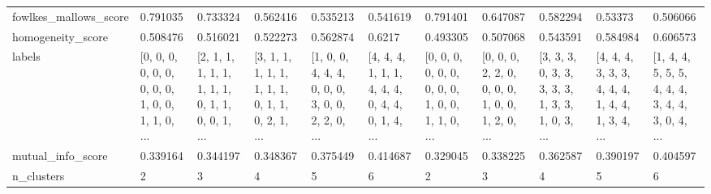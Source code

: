 \begin{tabular}{lllllllllll}
fowlkes\_mallows\_score &                                           0.791035 &                                           0.733324 &                                           0.562416 &                                           0.535213 &                                           0.541619 &                                           0.791401 &                                           0.647087 &                                           0.582294 &                                            0.53373 &                                           0.506066 \\
homogeneity\_score     &                                           0.508476 &                                           0.516021 &                                           0.522273 &                                           0.562874 &                                             0.6217 &                                           0.493305 &                                           0.507068 &                                           0.543591 &                                           0.584984 &                                           0.606573 \\
labels                &  [0, 0, 0, 0, 0, 0, 0, 0, 0, 1, 0, 0, 1, 1, 0, ... &  [2, 1, 1, 1, 1, 1, 1, 1, 1, 0, 1, 1, 0, 0, 1, ... &  [3, 1, 1, 1, 1, 1, 1, 1, 1, 0, 1, 1, 0, 2, 1, ... &  [1, 0, 0, 4, 4, 4, 0, 0, 0, 3, 0, 0, 2, 2, 0, ... &  [4, 4, 4, 1, 1, 1, 4, 4, 4, 0, 4, 4, 0, 1, 4, ... &  [0, 0, 0, 0, 0, 0, 0, 0, 0, 1, 0, 0, 1, 1, 0, ... &  [0, 0, 0, 2, 2, 0, 0, 0, 0, 1, 0, 0, 1, 2, 0, ... &  [3, 3, 3, 0, 3, 3, 3, 3, 3, 1, 3, 3, 1, 0, 3, ... &  [4, 4, 4, 3, 3, 3, 4, 4, 4, 1, 4, 4, 1, 3, 4, ... &  [1, 4, 4, 5, 5, 5, 4, 4, 4, 3, 4, 4, 3, 0, 4, ... \\
mutual\_info\_score     &                                           0.339164 &                                           0.344197 &                                           0.348367 &                                           0.375449 &                                           0.414687 &                                           0.329045 &                                           0.338225 &                                           0.362587 &                                           0.390197 &                                           0.404597 \\
n\_clusters            &                                                  2 &                                                  3 &                                                  4 &                                                  5 &                                                  6 &                                                  2 &                                                  3 &                                                  4 &                                                  5 &                                                  6 \\

\end{tabular}
